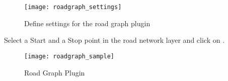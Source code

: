 \begin{figure}[ht]
    \centering
    \texttt{[image: roadgraph\_settings]}
    \caption{Define settings for the road graph plugin \nixcaption}\label{fig:roadgraphsettings}
\end{figure}

Select a Start and a Stop point in the road network layer and click on .

\begin{figure}[ht]
    \centering
    \texttt{[image: roadgraph\_sample]}
    \caption{Road Graph Plugin \nixcaption}\label{fig:roadgraphsample}
\end{figure}

\FloatBarrier
